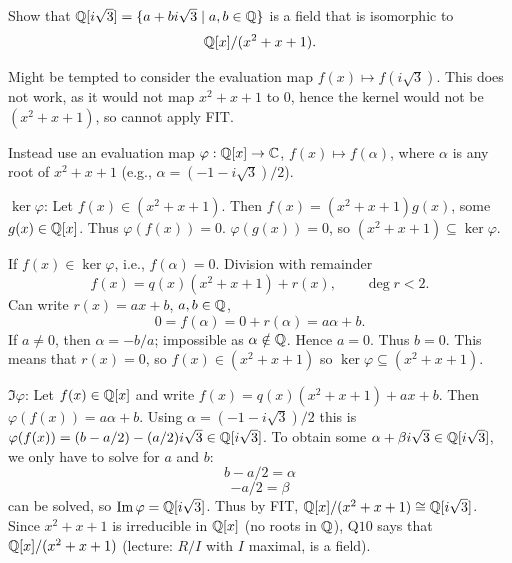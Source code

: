 \documentclass[10pt, a4paper]{article}
\begin{document}
\begin{problem}
    Show that $\mathbb{Q}[i\sqrt{3}] = \{a + bi\sqrt{3} \mid a, b \in \mathbb{Q}\}$ is a field that is isomorphic to
    \[
    \mathbb{Q}[x] / (x ^ 2 + x + 1).
    \]

    \begin{solution}
        Might be tempted to consider the evaluation map $f(x) \mapsto f(i\sqrt{3})$.
        This does not work,
        as it would not map $x ^ 2 + x + 1$ to $0$,
        hence the kernel would not be $(x ^ 2 + x + 1)$,
        so cannot apply FIT.

        Instead use an evaluation map $\varphi : \mathbb{Q}[x] \to \mathbb{C}$,
        $f(x) \mapsto f(\alpha)$,
        where $\alpha$ is any root of $x ^ 2 + x + 1$
        (e.g.,
        $\alpha = (-1 - i\sqrt{3}) / 2$).

        $\ker{\varphi}$:
        Let $f(x) \in (x ^ 2 + x + 1)$.
        Then $f(x) = (x ^ 2 + x + 1)g(x)$,
        some $g(x) \in \mathbb{Q}[x]$.
        Thus $\varphi(f(x)) = 0$.
        $\varphi(g(x)) = 0$,
        so $(x ^ 2 + x + 1) \subseteq \ker{\varphi}$.

        If $f(x) \in \ker{\varphi}$,
        i.e.,
        $f(\alpha) = 0$.
        Division with remainder
        \[
        f(x) = q(x)(x ^ 2 + x + 1) + r(x),\qquad \deg{r} < 2.
        \]
        Can write $r(x) = ax + b$,
        $a, b \in \mathbb{Q}$,
        \[
        0 = f(\alpha) = 0 + r(\alpha) = a\alpha + b.
        \]
        If $a \neq 0$,
        then $\alpha = -b / a$;
        impossible as $\alpha \notin \mathbb{Q}$.
        Hence $a = 0$.
        Thus $b = 0$.
        This means that $r(x) = 0$,
        so $f(x) \in (x ^ 2 + x + 1)$ so $\ker{\varphi} \subseteq (x ^ 2 + x + 1)$.

        $\Im{\varphi}$:
        Let $f(x) \in \mathbb{Q}[x]$ and write $f(x) = q(x)(x ^ 2 + x + 1) + ax + b$.
        Then $\varphi(f(x)) = a\alpha + b$.
        Using $\alpha = (-1 - i\sqrt{3}) / 2$ this is $\varphi(f(x)) = (b - a / 2) - (a / 2)i\sqrt{3} \in \mathbb{Q}[i\sqrt{3}]$.
        To obtain some $\alpha + \beta i\sqrt{3} \in \mathbb{Q}[i\sqrt{3}]$,
        we only have to solve for $a$ and $b$:
        \[
        b - a / 2 = \alpha
        \]
        \[
        -a / 2 = \beta
        \]
        can be solved,
        so $\mathrm{Im}\,{\varphi} = \mathbb{Q}[i\sqrt{3}]$.
        Thus by FIT,
        $\mathbb{Q}[x] / (x ^ 2 + x + 1) \cong \mathbb{Q}[i\sqrt{3}]$.
        Since $x ^ 2 + x + 1$ is irreducible in $\mathbb{Q}[x]$
        (no roots in $\mathbb{Q}$),
        Q$10$ says that $\mathbb{Q}[x] / (x ^ 2 + x + 1)$
        (lecture:
        $R / I$ with $I$ maximal,
        is a field).
    \end{solution}
\end{problem}
\end{document}
